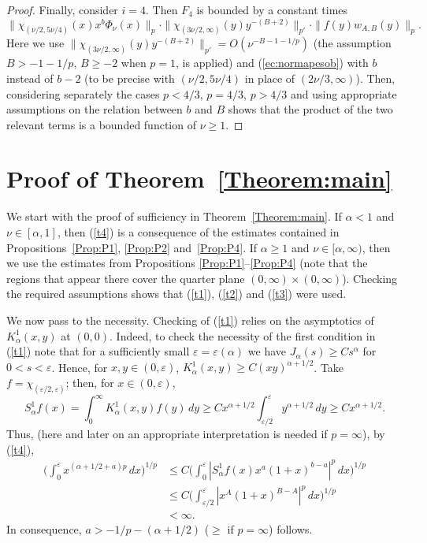 \documentclass[leqno,a4paper]{amsart}
\begin{document}
\begin{proof}
Finally, consider $i=4$. Then $F_4$ is bounded by a constant times
\begin{equation*}
\|\chi_{(\nu/2,5\nu/4)}(x)x^b\Phi_\nu(x)\|_{p}\cdot
\|\chi_{(3\nu/2,\infty)}(y)y^{-(B+2)}\|_{p'}\cdot
\|f(y)w_{A,B}(y)\|_p.
\end{equation*}
Here we use $\|\chi_{(3\nu/2,\infty)}(y)y^{-(B+2)}\|_{p'}=
O(\nu^{-B-1-1/p})$ (the assumption $B>-1-1/p$, $B\ge-2$ when $p=1$, is applied)
and (\ref{ec:normapesob}) with $b$ instead of $b-2$ (to be precise with
$(\nu/2,5\nu/4)$ in place of $(2\nu/3,\infty)$). Then,
considering separately the cases $p<4/3$, $p=4/3$, $p>4/3$ and using
appropriate assumptions on the relation between $b$ and $B$ shows that
the product of the two relevant terms is a bounded function of $\nu\ge1$.
\end{proof}

\section{Proof of Theorem~\ref{Theorem:main}}

We start with the proof of sufficiency in
Theorem~\ref{Theorem:main}. If $\alpha<1$ and $\nu\in[\alpha,1]$,
then (\ref{t4}) is a consequence of the estimates contained in
Propositions~\ref{Prop:P1}, \ref{Prop:P2} and~\ref{Prop:P4}. If
$\alpha\ge1$ and $\nu\in[\alpha,\infty)$, then we use the
estimates from Propositions \ref{Prop:P1}--\ref{Prop:P4} (note
that the regions that appear there cover the quarter plane
$(0,\infty)\times(0,\infty)$). Checking the required assumptions
shows that (\ref{t1}), (\ref{t2}) and (\ref{t3}) were used.

We now pass to the necessity. Checking of (\ref{t1}) relies on the
asymptotics of $K^1_\alpha(x,y)$ at $(0,0)$. Indeed,
to check the necessity of the first condition in (\ref{t1}) note that for a
sufficiently small $\varepsilon=\varepsilon(\alpha)$ we have $J_\alpha(s)\ge
Cs^\alpha$ for $0<s<\varepsilon$. Hence, for $x,y\in (0,\varepsilon)$,
$K^1_\alpha(x,y)\ge C(xy)^{\alpha+1/2}$. Take $f=\chi_{(\varepsilon/2,
\varepsilon)}$; then, for $x\in(0,\varepsilon)$,
$$
S_\alpha^1f(x)= \int_0^\infty K^1_\alpha(x,y) f(y)\,dy
\ge Cx^{\alpha+1/2} \int_{\varepsilon/2}^{\varepsilon}y^{\alpha+1/2}\,dy
\ge Cx^{\alpha+1/2}.
$$
Thus, (here and later on an appropriate interpretation is needed if
$p=\infty$), by (\ref{t4}),
\begin{align*}
\bigg(\int_0^\varepsilon x^{(\alpha+1/2+a)p}\,dx\bigg)^{1/p} &\le C
\bigg(\int_{0}^{\varepsilon}|S^1_\alpha f(x) x^a(1+x)^{b-a}|^p\,dx\bigg)^{1/p}\\
&\le C\bigg(\int_{\varepsilon/2}^{\varepsilon}| x^A(1+x)^{B-A}|^p\,dx\bigg)^{1/p}\\
&<\infty.
\end{align*}
In consequence, $a>-1/p-(\alpha+1/2)$ ($\ge$ if $p=\infty$) follows.
\end{document}
